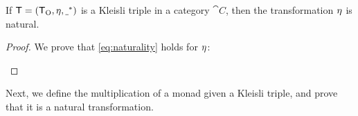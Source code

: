 \begin{proposition}
  \label{prop:triple-to-monad-unit}

  If $\mathsf{T} = (\mathsf{T}_{\operatorname{O}}, \eta, \underline{~}^*)$ is a
  Kleisli triple in a category $\cat{C}$, then the transformation
  $\eta$ is natural.

  \begin{proof}

    We prove that \eqref{eq:naturality} holds for $\eta$:
    \begin{steps}
        \eqby{\eqref{eq:triple-to-endofunctor-morphism-function}}
    \end{steps}

  \end{proof}

\end{proposition}

Next, we define the multiplication of a monad given a Kleisli triple,
and prove that it is a natural transformation.

